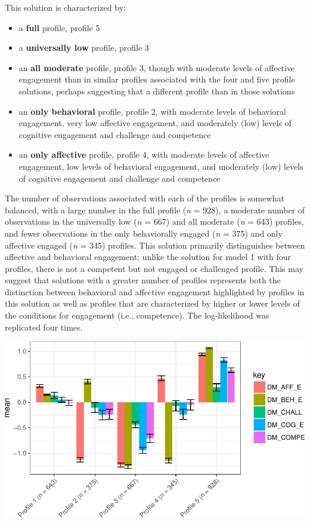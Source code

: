 \documentclass[]{msu-thesis}
\providecommand{\tightlist}{%
  \setlength{\itemsep}{0pt}\setlength{\parskip}{0pt}}
\theoremstyle{definition}
\theoremstyle{definition}
\theoremstyle{definition}
\theoremstyle{remark}
\begin{document}
This solution is characterized by:

\begin{itemize}
\tightlist
\item
  a \textbf{full} profile, profile 5
\item
  a \textbf{universally low} profile, profile 3
\item
  an \textbf{all moderate} profile, profile 3, though with moderate
  levels of affective engagement than in similar profiles associated
  with the four and five profile solutions, perhaps suggesting that a
  different profile than in those solutions
\item
  an \textbf{only behavioral} profile, profile 2, with moderate levels
  of behavioral engagement, very low affective engagement, and
  moderately (low) levels of cognitive engagement and challenge and
  competence
\item
  an \textbf{only affective} profile, profile 4, with moderate levels of
  affective engagement, low levels of behavioral engagement, and
  moderately (low) levels of cognitive engagement and challenge and
  competence
\end{itemize}

The number of observations associated with each of the profiles is
somewhat balanced, with a large number in the full profile (\emph{n} =
928), a moderate number of observations in the universally low (\emph{n}
= 667) and all moderate (\emph{n} = 643) profiles, and fewer
observations in the only behaviorally engaged (\emph{n} = 375) and only
affective engaged (\emph{n} = 345) profiles. This solution primarily
distinguishes between affective and behavioral engagement; unlike the
solution for model 1 with four profiles, there is not a competent but
not engaged or challenged profile. This may suggest that solutions with
a greater number of profiles represents both the distinction between
behavioral and affective engagement highlighted by profiles in this
solution as well as profiles that are characterized by higher or lower
levels of the conditions for engagement (i.e., competence). The
log-likelihood was replicated four times.

\begin{center}\includegraphics[width=0.8\linewidth]{rosenberg-dissertation_files/figure-latex/m1_5p-1} \end{center}
\end{document}
